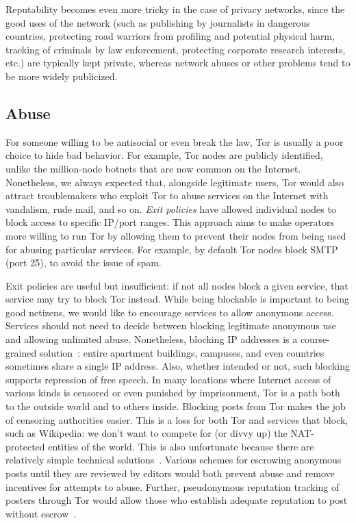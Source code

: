\documentclass{llncs}
\begin{document}
Reputability becomes even more tricky in the case of privacy networks,
since the good uses of the network (such as publishing by journalists
in dangerous countries, protecting road warriors from profiling and
potential physical harm, tracking of criminals by law enforcement,
protecting corporate research interests, etc.) are typically kept private,
whereas network abuses or other problems tend to be more widely
publicized.


\subsection{Abuse}
\label{subsec:tor-and-blacklists}

For someone willing to be antisocial or even break the law, Tor is
usually a poor choice to hide bad behavior. For example, Tor nodes are
publicly identified, unlike the million-node botnets that are now
common on the Internet. Nonetheless, we always expected that,
alongside legitimate users, Tor would also attract troublemakers who
exploit Tor to abuse services on the Internet with vandalism, rude
mail, and so on.  \emph{Exit policies} have allowed individual nodes
to block access to specific IP/port ranges.  This approach aims to
make operators more willing to run Tor by allowing them to prevent
their nodes from being used for abusing particular services.  For
example, by default Tor nodes block SMTP (port 25), to avoid the issue
of spam.

Exit policies are useful but insufficient: if not all nodes block a
given service, that service may try to block Tor instead.  While being
blockable is important to being good netizens, we would like to
encourage services to allow anonymous access. Services should not need
to decide between blocking legitimate anonymous use and allowing
unlimited abuse.  Nonetheless, blocking IP addresses is a
course-grained solution~\cite{netauth}: entire apartment buildings,
campuses, and even countries sometimes share a single IP address.
Also, whether intended or not, such blocking supports repression of
free speech. In many locations where Internet access of various kinds
is censored or even punished by imprisonment, Tor is a path both to
the outside world and to others inside.  Blocking posts from Tor makes
the job of censoring authorities easier.  This is a loss for both Tor
and services that block, such as Wikipedia: we don't want to compete
for (or divvy up) the NAT-protected entities of the world.  This is
also unfortunate because there are relatively simple technical
solutions~\cite{nym}.  Various schemes for escrowing anonymous posts
until they are reviewed by editors would both prevent abuse and remove
incentives for attempts to abuse. Further, pseudonymous reputation
tracking of posters through Tor would allow those who establish
adequate reputation to post without escrow~\cite{nym,nymble}.
\end{document}
